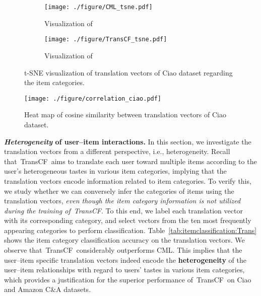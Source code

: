 \documentclass[conference]{IEEEtran}
\newcommand{\propose}{\textsf{{TransCF}}}
\begin{document}
\begin{figure*}[t]
	\centering
	\begin{minipage}{0.6\textwidth}
\centering\captionsetup{width=0.95\linewidth}
		\begin{subfigure}{0.495\textwidth}
			\centering
			\texttt{[image: ./figure/CML\_tsne.pdf]}
			\caption{Visualization of }
		\end{subfigure}
		\begin{subfigure}{0.495\textwidth}
			\centering
			\texttt{[image: ./figure/TransCF\_tsne.pdf]}
			\caption{Visualization of }
		\end{subfigure}
\caption{t-SNE visualization of translation vectors of Ciao dataset regarding the item categories.}
		\label{fig:tsne}
	\end{minipage}\hfill
	\begin{minipage}{0.4\textwidth}
		\centering
\vspace{-7pt}
		\texttt{[image: ./figure/correlation\_ciao.pdf]}
\caption{Heat map of cosine similarity between translation vectors of Ciao dataset. }
		\label{fig:cosine}
	\end{minipage}
	\vspace{-2ex}
\end{figure*}

\smallskip
\noindent\textbf{\textit{Heterogeneity} of user--item interactions. }
In this section, we investigate the translation vectors from a different perspective, i.e., heterogeneity. 
Recall that~\propose~aims to translate each user toward multiple items according to the user's heterogeneous tastes in various item categories, implying that
the translation vectors encode information related to item categories.
To verify this, we study whether we can conversely infer the categories of items using the translation vectors, \textit{even though the item category information is not utilized during the training of~\propose}. 
To this end, we label each translation vector  with its corresponding category, and select vectors from the ten most frequently appearing categories
to perform classification.
Table~\ref{tab:itemclassification:Trans} shows the item category classification accuracy on the translation vectors. We observe that~\propose~considerably outperforms CML. This implies that the user--item specific translation vectors indeed encode the \textbf{heterogeneity} of the user--item relationships with regard to users' tastes in various item categories,
which provides a justification for the superior performance of~\propose~on Ciao and Amazon C\&A datasets.
\end{document}

